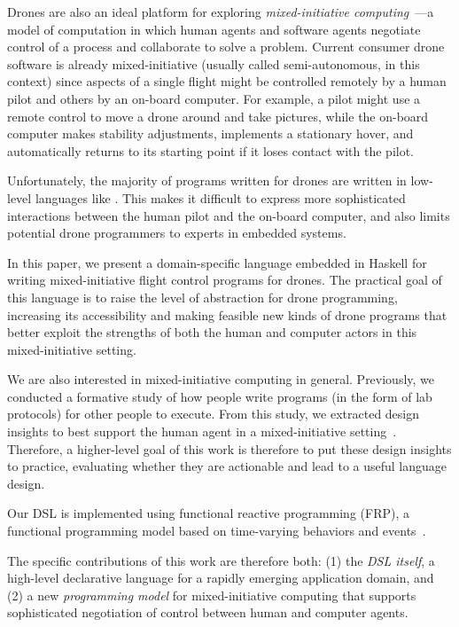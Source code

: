 \documentclass{sig-alternate-05-2015}
\begin{document}
Drones are also an ideal platform for exploring \emph{mixed-initiative
computing}~\cite{Horvitz1999}---a model of computation in which human agents
and software agents negotiate control of a process and collaborate to solve a
problem.
%
Current consumer drone software is already mixed-initiative (usually called
semi-autonomous, in this context) since aspects of a single flight might be
controlled remotely by a human pilot and others by an on-board computer. For
example, a pilot might use a remote control to move a drone around and take
pictures, while the on-board computer makes stability adjustments, implements a
stationary hover, and automatically returns to its starting point if it loses
contact with the pilot.

Unfortunately, the majority of programs written for drones are written in
low-level languages like . This makes it difficult to express more
sophisticated interactions between the human pilot and the on-board computer,
and also limits potential drone programmers to experts in embedded systems.

In this paper, we present a domain-specific language embedded in Haskell for
writing mixed-initiative flight control programs for drones. The practical goal
of this language is to raise the level of abstraction for drone programming,
increasing its accessibility and making feasible new kinds of drone programs
that better exploit the strengths of both the human and computer actors in this
mixed-initiative setting.

We are also interested in mixed-initiative computing in general. Previously, we
conducted a formative study of how people write programs (in the form of lab
protocols) for other people to execute. From this study, we extracted design
insights to best support the human agent in a mixed-initiative
setting~\cite{abbott2015prog}.
%
Therefore, a higher-level goal of this work is therefore to put these design
insights to practice, evaluating whether they are actionable and lead to a
useful language design.

Our DSL is implemented using functional reactive programming (FRP), a
functional programming model based on time-varying behaviors and
events~\cite{EH97fra,WH00frp}.

The specific contributions of this work are therefore both: (1) the \emph{DSL
itself}, a high-level declarative language for a rapidly emerging application
domain, and (2) a new \emph{programming model} for mixed-initiative computing
that supports sophisticated negotiation of control between human and computer
agents.
\end{document}
